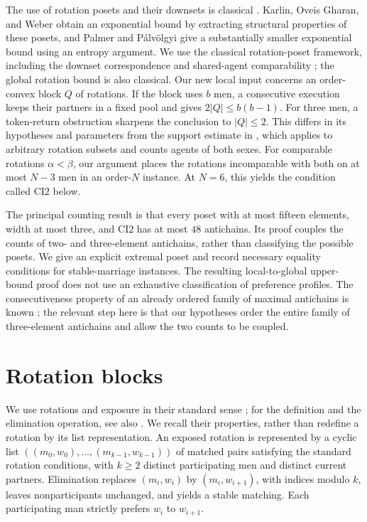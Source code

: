 \documentclass[11pt]{article}
\numberwithin{equation}{section}
\theoremstyle{definition}
\theoremstyle{remark}
\begin{document}
The use of rotation posets and their downsets is classical
\cite{IrvingLeather1986}.  Karlin, Oveis Gharan, and Weber
\cite{KarlinOGW2018} obtain an exponential bound by extracting structural
properties of these posets, and Palmer and P\'alv\"olgyi
\cite{PalmerPalvolgyi2022} give a substantially smaller exponential bound
using an entropy argument.  We use the classical rotation-poset framework,
including the downset correspondence
\cite{IrvingLeather1986,GusfieldIrving1989} and shared-agent comparability
\cite[Claim~4.6]{KarlinOGW2018}; the global rotation bound is also classical.
Our new local input concerns an order-convex block $Q$ of rotations.  If the
block uses $b$ men, a consecutive execution keeps their partners in a fixed
pool and gives $2|Q|\le b(b-1)$.  For three men, a token-return obstruction
sharpens the conclusion to $|Q|\le2$.  This differs in its hypotheses and
parameters from the support estimate in \cite[Claim~4.7]{KarlinOGW2018},
which applies to arbitrary rotation subsets and counts agents of both sexes.
For comparable rotations $\alpha<\beta$, our argument places the rotations
incomparable with both on at most $N-3$ men in an order-$N$ instance.
At $N=6$, this yields the condition called $\mathrm{CI2}$ below.

The principal counting result is that every poset with at most fifteen
elements, width at most three, and $\mathrm{CI2}$ has at most $48$
antichains.  Its proof couples the counts of two- and three-element
antichains, rather than classifying the possible posets.  We give an explicit
extremal poset and record necessary equality conditions for stable-marriage
instances.  The resulting local-to-global upper-bound proof does not use an
exhaustive classification of preference profiles.  The consecutiveness
property of an already ordered family of
maximal antichains is known \cite{DusartHC2024}; the relevant step here is
that our hypotheses order the entire family of three-element antichains
and allow the two counts to be coupled.

\section{Rotation blocks}

We use rotations and exposure in their standard sense
\cite{IrvingLeather1986,GusfieldIrving1989}; for the definition and the
elimination operation, see also \cite[Definitions~4.1 and~4.4]{KarlinOGW2018}.
We recall their properties, rather than redefine a rotation by its list
representation.  An exposed rotation is represented by a cyclic list
$((m_0,w_0),\ldots,(m_{k-1},w_{k-1}))$ of matched pairs satisfying the
standard rotation conditions, with $k\ge2$ distinct participating men and
distinct current partners.  Elimination replaces $(m_i,w_i)$ by
$(m_i,w_{i+1})$, with indices
modulo $k$, leaves nonparticipants unchanged, and yields a stable matching.
Each participating man strictly prefers $w_i$ to $w_{i+1}$.
\end{document}
